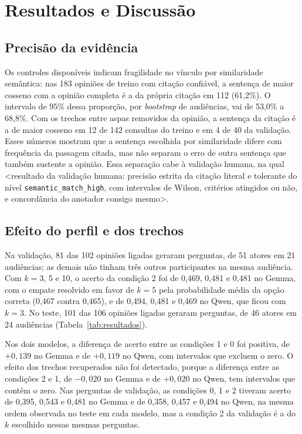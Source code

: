 \section{Resultados e Discuss\~ao}
\label{sec:resultados}

\subsection{Precisão da evidência}
\label{sec:resultados-udv}

Os controles disponíveis indicam fragilidade no vínculo por similaridade semântica: nas 183 opiniões
de treino com citação confiável, a sentença de maior cosseno com a opinião completa é a da própria
citação em 112 (61,2\%). O intervalo de 95\% dessa proporção, por \textit{bootstrap} de audiências,
vai de 53,0\% a 68,8\%. Com os trechos entre aspas removidos da opinião, a sentença da citação é a
de maior cosseno em 12 de 142 consultas do treino e em 4 de 40 da validação. Esses números mostram
que a sentença escolhida por similaridade difere com frequência da passagem citada, mas não separam
o erro de outra sentença que também sustente a opinião. Essa separação cabe à validação humana, na
qual <resultado da validação humana: precisão estrita da citação literal e tolerante do nível
\texttt{semantic\_match\_high}, com intervalos de Wilson, critérios atingidos ou não, e concordância
do anotador consigo mesmo>.

\subsection{Efeito do perfil e dos trechos}
\label{sec:resultados-simulacao}



Na validação, 81 das 102 opiniões ligadas geraram perguntas, de 51 atores em 21 audiências; as
demais não tinham três outros participantes na mesma audiência. Com $k = 3$, 5 e 10, o acerto da
condição 2 foi de 0,469, 0,481 e 0,481 no Gemma, com o empate resolvido em favor de $k = 5$ pela
probabilidade média da opção correta (0,467 contra 0,465), e de 0,494, 0,481 e 0,469 no Qwen, que
ficou com $k = 3$. No teste, 101 das 106 opiniões ligadas geraram perguntas, de 46 atores em 24
audiências (Tabela~\ref{tab:resultados}).

Nos dois modelos, a diferença de acerto entre as condições 1 e 0 foi positiva, de $+0{,}139$ no
Gemma e de $+0{,}119$ no Qwen, com intervalos que excluem o zero. O efeito dos trechos recuperados
não foi detectado, porque a diferença entre as condições 2 e 1, de $-0{,}020$ no Gemma e de
$+0{,}020$ no Qwen, tem intervalos que contêm o zero. Nas perguntas de validação, as condições 0, 1 e
2 tiveram acerto de 0,395, 0,543 e 0,481 no Gemma e de 0,358, 0,457 e 0,494 no Qwen, na mesma ordem
observada no teste em cada modelo, mas a condição 2 da validação é a do $k$ escolhido nessas mesmas
perguntas.

